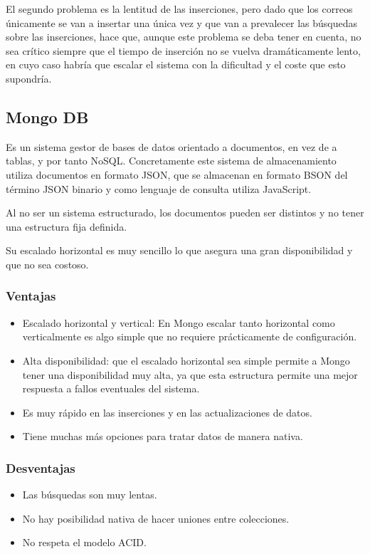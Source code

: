 El segundo problema es la lentitud de las inserciones, pero dado que los correos únicamente se van a insertar una única vez y que van a prevalecer las búsquedas sobre las inserciones, hace que, aunque este problema se deba tener en cuenta, no sea crítico siempre que el tiempo de inserción no se vuelva dramáticamente lento, en cuyo caso habría que escalar el sistema con la dificultad y el coste que esto supondría.

\subsection{Mongo DB}
Es un sistema gestor de bases de datos orientado a documentos, en vez de a tablas, y por tanto NoSQL. Concretamente este sistema de almacenamiento utiliza documentos en formato JSON, que se almacenan en formato BSON del término JSON binario y como lenguaje de consulta utiliza JavaScript.

Al no ser un sistema estructurado, los documentos pueden ser distintos y no tener una estructura fija definida. 

Su escalado horizontal es muy sencillo lo que asegura una gran disponibilidad y que no sea costoso. 
\subsubsection{Ventajas}
\begin{itemize}
    \item Escalado horizontal y vertical: En Mongo escalar tanto horizontal como verticalmente es algo simple que no requiere prácticamente de configuración. 
    \item Alta disponibilidad: que el escalado horizontal sea simple permite a Mongo tener una disponibilidad muy alta, ya que esta estructura permite una mejor respuesta a fallos eventuales del sistema. 
    \item Es muy rápido en las inserciones y en las actualizaciones de datos. 
    \item Tiene muchas más opciones para tratar datos de manera nativa. 
\end{itemize}

\subsubsection{Desventajas}
\begin{itemize}
    \item Las búsquedas son muy lentas.
    \item No hay posibilidad nativa de hacer uniones entre colecciones. 
    \item No respeta el modelo ACID.
\end{itemize}

